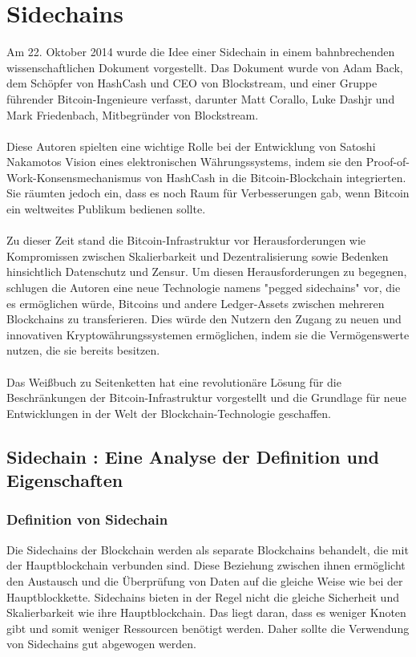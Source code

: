 \chapter{Sidechains}
Am 22. Oktober 2014 wurde die Idee einer Sidechain in einem bahnbrechenden wissenschaftlichen Dokument vorgestellt. Das Dokument wurde von Adam Back, dem Schöpfer von HashCash und CEO von Blockstream, und einer Gruppe führender Bitcoin-Ingenieure verfasst, darunter Matt Corallo, Luke Dashjr und Mark Friedenbach, Mitbegründer von Blockstream. \cite{coin_desk}\\ \\
Diese Autoren spielten eine wichtige Rolle bei der Entwicklung von Satoshi Nakamotos Vision eines elektronischen Währungssystems, indem sie den Proof-of-Work-Konsensmechanismus von HashCash in die Bitcoin-Blockchain integrierten. Sie räumten jedoch ein, dass es noch Raum für Verbesserungen gab, wenn Bitcoin ein weltweites Publikum bedienen sollte. \\ \\
Zu dieser Zeit stand die Bitcoin-Infrastruktur vor Herausforderungen wie Kompromissen zwischen Skalierbarkeit und Dezentralisierung sowie Bedenken hinsichtlich Datenschutz und Zensur. Um diesen Herausforderungen zu begegnen, schlugen die Autoren eine neue Technologie namens "pegged sidechains" vor, die es ermöglichen würde, Bitcoins und andere Ledger-Assets zwischen mehreren Blockchains zu transferieren. Dies würde den Nutzern den Zugang zu neuen und innovativen Kryptowährungssystemen ermöglichen, indem sie die Vermögenswerte nutzen, die sie bereits besitzen.\\ \\
Das Weißbuch zu Seitenketten hat eine revolutionäre Lösung für die Beschränkungen der Bitcoin-Infrastruktur vorgestellt und die Grundlage für neue Entwicklungen in der Welt der Blockchain-Technologie geschaffen.

\section{Sidechain : Eine Analyse der Definition und Eigenschaften}
\subsection{Definition von Sidechain}
Die Sidechains der Blockchain werden als separate Blockchains behandelt, die mit der Hauptblockchain verbunden sind. Diese Beziehung zwischen ihnen ermöglicht den Austausch und die Überprüfung von Daten auf die gleiche Weise wie bei der Hauptblockkette. Sidechains bieten in der Regel nicht die gleiche Sicherheit und Skalierbarkeit wie ihre Hauptblockchain. Das liegt daran, dass es weniger Knoten gibt und somit weniger Ressourcen benötigt werden. Daher sollte die Verwendung von Sidechains gut abgewogen werden. 
